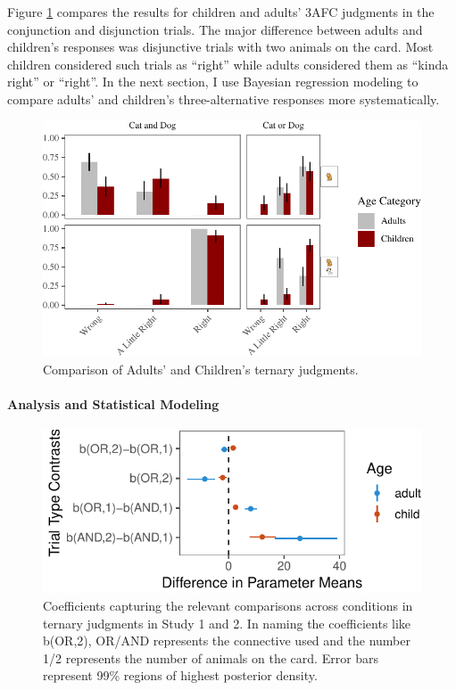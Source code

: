 \documentclass[man]{apa6}
\theoremstyle{definition}
\theoremstyle{definition}
\theoremstyle{definition}
\theoremstyle{remark}
\begin{document}
Figure \ref{fig:childAdultComp} compares the results for children and
adults' 3AFC judgments in the conjunction and disjunction trials. The
major difference between adults and children's responses was disjunctive
trials with two animals on the card. Most children considered such
trials as \enquote{right} while adults considered them as \enquote{kinda
right} or \enquote{right}. In the next section, I use Bayesian
regression modeling to compare adults' and children's three-alternative
responses more systematically.

\begin{figure}[t]

{\centering \includegraphics{figs/childAdultComp-1} 

}

\caption{Comparison of Adults' and Children's ternary judgments.}\label{fig:childAdultComp}
\end{figure}

\paragraph{Analysis and Statistical
Modeling}\label{analysis-and-statistical-modeling}

\begin{figure}[t]

{\centering \includegraphics{figs/stanModelPlot-1} 

}

\caption{Coefficients capturing the relevant comparisons across conditions in ternary judgments in Study 1 and 2. In naming the coefficients like b(OR,2), OR/AND represents the connective used and the number 1/2 represents the number of animals on the card. Error bars represent 99\% regions of highest posterior density.}\label{fig:stanModelPlot}
\end{figure}
\end{document}
